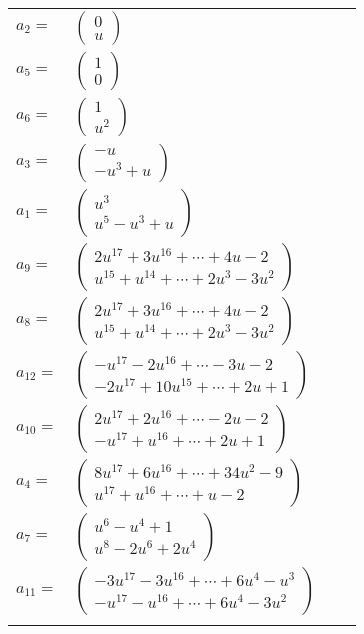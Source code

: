\documentclass[1p]{elsarticle_modified}
\theoremstyle{definition}
\begin{document}
\begin{tabular}{m{7pt} m{180pt} m{7pt} m{180pt} }
\flushright $a_{2}=$&$\begin{pmatrix}0\\u\end{pmatrix}$ \\
\flushright $a_{5}=$&$\begin{pmatrix}1\\0\end{pmatrix}$ \\
\flushright $a_{6}=$&$\begin{pmatrix}1\\u^2\end{pmatrix}$ \\
\flushright $a_{3}=$&$\begin{pmatrix}- u\\- u^3+u\end{pmatrix}$ \\
\flushright $a_{1}=$&$\begin{pmatrix}u^3\\u^5- u^3+u\end{pmatrix}$ \\
\flushright $a_{9}=$&$\begin{pmatrix}2 u^{17}+3 u^{16}+\cdots+4 u-2\\u^{15}+u^{14}+\cdots+2 u^3-3 u^2\end{pmatrix}$ \\
\flushright $a_{8}=$&$\begin{pmatrix}2 u^{17}+3 u^{16}+\cdots+4 u-2\\u^{15}+u^{14}+\cdots+2 u^3-3 u^2\end{pmatrix}$ \\
\flushright $a_{12}=$&$\begin{pmatrix}- u^{17}-2 u^{16}+\cdots-3 u-2\\-2 u^{17}+10 u^{15}+\cdots+2 u+1\end{pmatrix}$ \\
\flushright $a_{10}=$&$\begin{pmatrix}2 u^{17}+2 u^{16}+\cdots-2 u-2\\- u^{17}+u^{16}+\cdots+2 u+1\end{pmatrix}$ \\
\flushright $a_{4}=$&$\begin{pmatrix}8 u^{17}+6 u^{16}+\cdots+34 u^2-9\\u^{17}+u^{16}+\cdots+u-2\end{pmatrix}$ \\
\flushright $a_{7}=$&$\begin{pmatrix}u^6- u^4+1\\u^8-2 u^6+2 u^4\end{pmatrix}$ \\
\flushright $a_{11}=$&$\begin{pmatrix}-3 u^{17}-3 u^{16}+\cdots+6 u^4- u^3\\- u^{17}- u^{16}+\cdots+6 u^4-3 u^2\end{pmatrix}$\\&\end{tabular}
\end{document}
